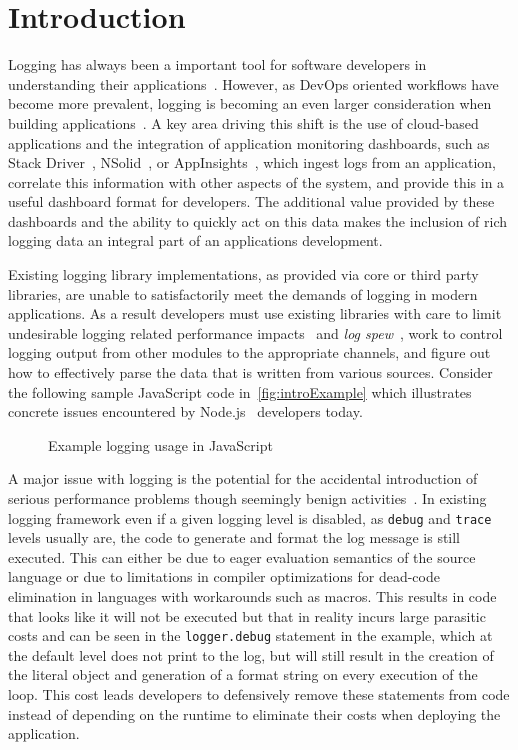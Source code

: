 \documentclass[sigplan,10pt,review]{acmart}
\begin{document}
\section{Introduction} 
\label{sec:intro}
Logging has always been a important tool for software developers in
understanding their applications~\cite{logdebug,logdebug2,logstudy}. 
However, as DevOps oriented workflows have
become more prevalent, logging is becoming an even larger consideration when
building applications~\cite{logstudy,logstudy2}. A key area driving this shift is the use of cloud-based
applications and the integration of application monitoring dashboards, such as
Stack Driver~\cite{StackDriver}, NSolid~\cite{NSolid}, or
AppInsights~\cite{AppInsights}, which ingest logs from an application, correlate
this information with other aspects of the system, and provide this in a useful
dashboard format for developers. The additional value provided by these
dashboards and the ability to quickly act on this data makes the inclusion of
rich logging data an integral part of an applications development.

Existing logging library implementations, as provided via core or third party
libraries, are unable to satisfactorily meet the demands of logging in modern
applications. As a result developers must use existing libraries with care to
limit undesirable logging related performance impacts~\cite{learnlog} and \emph{log spew}~\cite{learnlog,logstudy2}, work 
to control logging output from other modules to the appropriate channels, and figure
out how to effectively parse the data that is written from various sources.
Consider the following sample JavaScript code in~\autoref{fig:introExample} 
which illustrates concrete issues encountered by Node.js~\cite{Node} developers today.

\begin{figure*}[t]

\caption{Example logging usage in JavaScript}
\label{fig:introExample}
\end{figure*}

A major issue with logging is the potential for the accidental introduction 
of serious performance problems though seemingly benign activities~\cite{logdebug,logdebug2,logstudy,learnlog,logstudy2}. In 
existing logging framework even if a given logging level is disabled, 
as \texttt{debug} and \texttt{trace} levels usually are, the code to generate 
and format the log message is still executed. This can either be due to eager 
evaluation semantics of the source language or due to limitations in compiler 
optimizations for dead-code elimination in languages with workarounds such as 
macros. This results in code that looks like it will not be executed but that in 
reality incurs large parasitic costs and can be seen in the \texttt{logger.debug} 
statement in the example, which at the default level does not print to the log, but will
still result in the creation of the literal object and generation of a format
string on every execution of the loop. This cost leads developers to defensively
remove these statements from code instead of depending on the runtime to
eliminate their costs when deploying the application.
\end{document}
